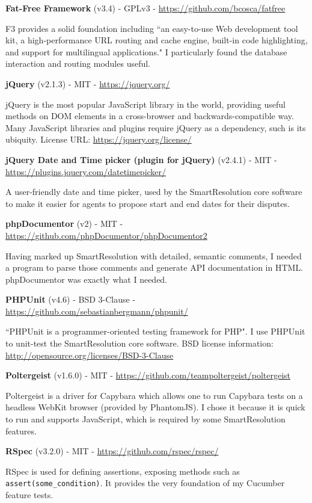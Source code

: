 \textbf{Fat-Free Framework} (v3.4) - GPLv3 - \url{https://github.com/bcosca/fatfree}

F3 provides a solid foundation including ``an easy-to-use Web development tool kit, a high-performance URL routing and cache engine, built-in code highlighting, and support for multilingual applications." I particularly found the database interaction and routing modules useful.

\textbf{jQuery} (v2.1.3) - MIT - \url{https://jquery.org/}

jQuery is the most popular JavaScript library in the world, providing useful methods on DOM elements in a cross-browser and backwards-compatible way. Many JavaScript libraries and plugins require jQuery as a dependency, such is its ubiquity. License URL: \url{https://jquery.org/license/}

\textbf{jQuery Date and Time picker (plugin for jQuery)} (v2.4.1) - MIT - \url{https://plugins.jquery.com/datetimepicker/}

A user-friendly date and time picker, used by the SmartResolution core software to make it easier for agents to propose start and end dates for their disputes.

\textbf{phpDocumentor} (v2) - MIT - \url{https://github.com/phpDocumentor/phpDocumentor2}

Having marked up SmartResolution with detailed, semantic comments, I needed a program to parse those comments and generate API documentation in HTML. phpDocumentor was exactly what I needed.

\textbf{PHPUnit} (v4.6) - BSD 3-Clause - \url{https://github.com/sebastianbergmann/phpunit/}

``PHPUnit is a programmer-oriented testing framework for PHP". I use PHPUnit to unit-test the SmartResolution core software. BSD license information: \url{http://opensource.org/licenses/BSD-3-Clause}

\textbf{Poltergeist} (v1.6.0) - MIT - \url{https://github.com/teampoltergeist/poltergeist}

Poltergeist is a driver for Capybara which allows one to run Capybara tests on a headless WebKit browser (provided by PhantomJS). I chose it because it is quick to run and supports JavaScript, which is required by some SmartResolution features.

\textbf{RSpec} (v3.2.0) - MIT - \url{https://github.com/rspec/rspec/}

RSpec is used for defining assertions, exposing methods such as \lstinline{assert(some_condition)}. It provides the very foundation of my Cucumber feature tests.

